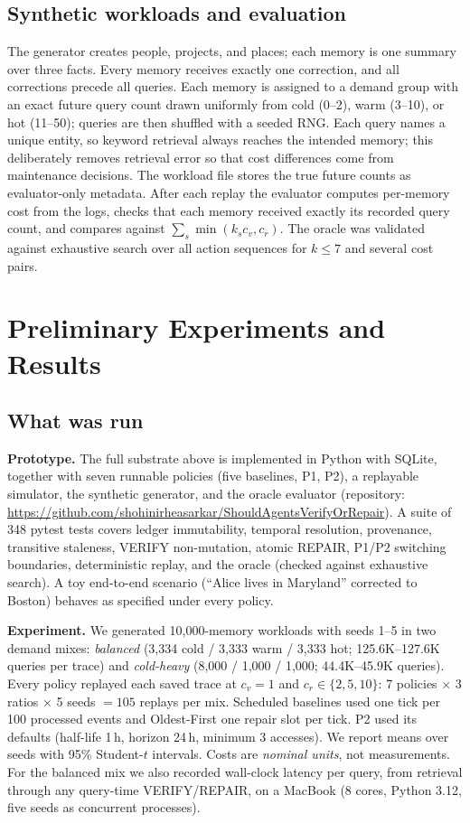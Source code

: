 \documentclass{article}
\begin{document}
\subsection{Synthetic workloads and evaluation}
The generator creates people, projects, and places; each memory is one summary
over three facts. Every memory receives exactly one correction, and all
corrections precede all queries. Each memory is assigned to a demand group with
an exact future query count drawn uniformly from cold (0--2), warm (3--10), or
hot (11--50); queries are then shuffled with a seeded RNG. Each query names a
unique entity, so keyword retrieval always reaches the intended memory; this
deliberately removes retrieval error so that cost differences come from
maintenance decisions. The workload file stores the true future counts as
evaluator-only metadata. After each replay the evaluator computes per-memory
cost from the logs, checks that each memory received exactly its recorded
query count, and compares against $\sum_s \min(k_s c_v, c_r)$. The oracle was
validated against exhaustive search over all action sequences for
$k\le7$ and several cost pairs.

\section{Preliminary Experiments and Results}
\label{sec:prelim}

\subsection{What was run}
\textbf{Prototype.} The full substrate above is implemented in Python with
SQLite, together with seven runnable policies (five baselines, P1, P2), a
replayable simulator, the synthetic generator, and the oracle evaluator
(repository: \url{https://github.com/shohinirheasarkar/ShouldAgentsVerifyOrRepair}).
A suite of 348 pytest tests covers ledger immutability, temporal
resolution, provenance, transitive staleness, VERIFY non-mutation, atomic
REPAIR, P1/P2 switching boundaries, deterministic replay, and
the oracle (checked against exhaustive search). A toy end-to-end scenario
(``Alice lives in Maryland'' corrected to Boston) behaves as specified under
every policy.

\textbf{Experiment.} We generated 10,000-memory workloads with seeds 1--5 in
two demand mixes: \emph{balanced} (3,334 cold / 3,333 warm / 3,333 hot;
125.6K--127.6K queries per trace) and \emph{cold-heavy} (8,000 / 1,000 / 1,000;
44.4K--45.9K queries). Every policy replayed each saved trace at
$c_v=1$ and $c_r\in\{2,5,10\}$: 7 policies $\times$ 3 ratios $\times$ 5 seeds
$=105$ replays per mix. Scheduled baselines used one tick per 100 processed
events and Oldest-First one repair slot per tick. P2 used its defaults
(half-life 1\,h, horizon 24\,h, minimum 3 accesses). We report means over seeds
with 95\% Student-$t$ intervals. Costs are \emph{nominal units}, not
measurements. For the balanced mix we also recorded wall-clock latency per
query, from retrieval through any query-time VERIFY/REPAIR, on a MacBook
(8 cores, Python 3.12, five seeds as concurrent processes).
\end{document}
